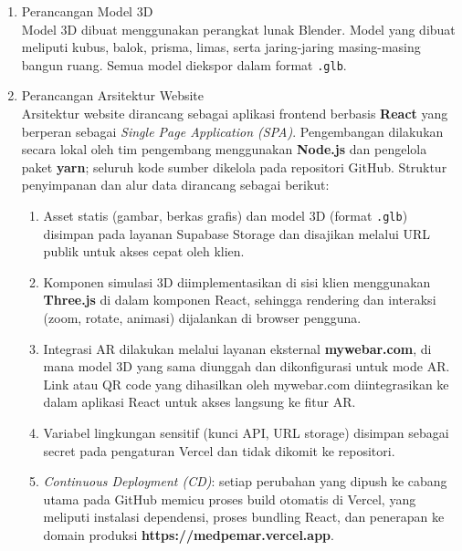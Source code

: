 \begin{enumerate}[leftmargin=1cm, label=\arabic*.]
\begin{enumerate}
\begin{table}[H]
\begin{tabular}{|p{3.5cm}|p{9cm}|}
                \hline
            \end{tabular}
        \end{table}
        \item Perancangan Model 3D\\
        \hspace*{1cm}Model 3D dibuat menggunakan perangkat lunak Blender. Model yang dibuat meliputi kubus, balok, prisma, limas, serta jaring-jaring masing-masing bangun ruang. Semua model diekspor dalam format \texttt{.glb}.
        \item Perancangan Arsitektur Website\\
        \hspace*{1cm}Arsitektur website dirancang sebagai aplikasi frontend berbasis \textbf{React} yang berperan sebagai \textit{Single Page Application (SPA)}. Pengembangan dilakukan secara lokal oleh tim pengembang menggunakan \textbf{Node.js} dan pengelola paket  \textbf{yarn}; seluruh kode sumber dikelola pada repositori GitHub. Struktur penyimpanan dan alur data dirancang sebagai berikut:

        \begin{enumerate}[leftmargin=*, label=--]
            \item Asset statis (gambar, berkas grafis) dan model 3D (format \texttt{.glb}) disimpan pada layanan Supabase Storage dan disajikan melalui URL publik untuk akses cepat oleh klien.
            \item Komponen simulasi 3D diimplementasikan di sisi klien menggunakan \textbf{Three.js} di dalam komponen React, sehingga rendering dan interaksi (zoom, rotate, animasi) dijalankan di browser pengguna.
            \item Integrasi AR dilakukan melalui layanan eksternal \textbf{mywebar.com}, di mana model 3D yang sama diunggah dan dikonfigurasi untuk mode AR. Link atau QR code yang dihasilkan oleh mywebar.com diintegrasikan ke dalam aplikasi React untuk akses langsung ke fitur AR.
            \item Variabel lingkungan sensitif (kunci API, URL storage) disimpan sebagai secret pada pengaturan Vercel dan tidak dikomit ke repositori.
            \item \textit{Continuous Deployment (CD)}: setiap perubahan yang dipush ke cabang utama pada GitHub memicu proses build otomatis di Vercel, yang meliputi instalasi dependensi, proses bundling React, dan penerapan ke domain produksi \textbf{https://medpemar.vercel.app}.
        \end{enumerate}


\end{enumerate}
\end{enumerate}
